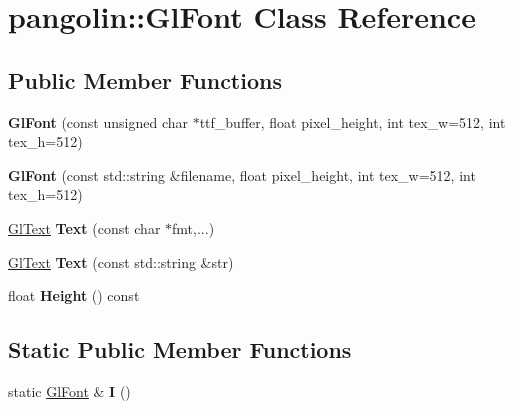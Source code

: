 \hypertarget{classpangolin_1_1_gl_font}{}\section{pangolin\+:\+:Gl\+Font Class Reference}
\label{classpangolin_1_1_gl_font}
\subsection*{Public Member Functions}
\begin{DoxyCompactItemize}
\item 
{\bfseries Gl\+Font} (const unsigned char $\ast$ttf\+\_\+buffer, float pixel\+\_\+height, int tex\+\_\+w=512, int tex\+\_\+h=512)\hypertarget{classpangolin_1_1_gl_font_a415c64b1617ba1d5b1339602746cab5e}{}\label{classpangolin_1_1_gl_font_a415c64b1617ba1d5b1339602746cab5e}

\item 
{\bfseries Gl\+Font} (const std\+::string \&filename, float pixel\+\_\+height, int tex\+\_\+w=512, int tex\+\_\+h=512)\hypertarget{classpangolin_1_1_gl_font_acf8674e7ef87fd9baf65d4df5067b888}{}\label{classpangolin_1_1_gl_font_acf8674e7ef87fd9baf65d4df5067b888}

\item 
\hyperlink{classpangolin_1_1_gl_text}{Gl\+Text} {\bfseries Text} (const char $\ast$fmt,...)\hypertarget{classpangolin_1_1_gl_font_aa01e014e321b6198aaf3e788a004c134}{}\label{classpangolin_1_1_gl_font_aa01e014e321b6198aaf3e788a004c134}

\item 
\hyperlink{classpangolin_1_1_gl_text}{Gl\+Text} {\bfseries Text} (const std\+::string \&str)\hypertarget{classpangolin_1_1_gl_font_a75978f30f9bad8d0a5a7e78df3dc7a00}{}\label{classpangolin_1_1_gl_font_a75978f30f9bad8d0a5a7e78df3dc7a00}

\item 
float {\bfseries Height} () const \hypertarget{classpangolin_1_1_gl_font_a56ca3022889d3b150112aa631bba0dab}{}\label{classpangolin_1_1_gl_font_a56ca3022889d3b150112aa631bba0dab}

\end{DoxyCompactItemize}
\subsection*{Static Public Member Functions}
\begin{DoxyCompactItemize}
\item 
static \hyperlink{classpangolin_1_1_gl_font}{Gl\+Font} \& {\bfseries I} ()\hypertarget{classpangolin_1_1_gl_font_af0a76ffa1929730c31d81011459b60bf}{}\label{classpangolin_1_1_gl_font_af0a76ffa1929730c31d81011459b60bf}

\end{DoxyCompactItemize}
